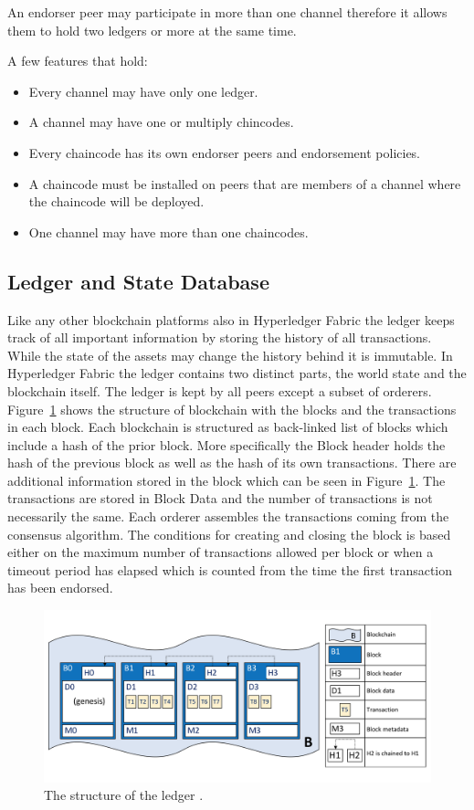 An endorser peer may participate in more than one channel therefore it allows them to hold two ledgers or more at the same time. 

A few features that hold: 
\begin{itemize}
  \item Every channel may have only one ledger.
  \item A channel may have one or multiply chincodes.
  \item Every chaincode has its own endorser peers and endorsement policies.
  \item A chaincode must be installed on peers that are members of a channel where the chaincode will be deployed. 
  \item One channel may have more than one chaincodes.
  \end{itemize}


\subsection{Ledger and State Database}

Like any other blockchain platforms also in Hyperledger Fabric the ledger keeps track of all important information by storing the history of all transactions. While the state of the assets may change the history behind it is immutable. In Hyperledger Fabric the ledger contains two distinct parts, the world state and the blockchain itself. 
The ledger is kept by all peers except a subset of orderers. 
Figure~\ref{fig:ledgerdiagram} shows the structure of blockchain with the blocks and the transactions in each block. Each blockchain is structured as back-linked list of blocks which include a hash of the prior block. More specifically the Block header holds the hash of the previous block as well as the hash of its own transactions. There are additional information stored in the block which can be seen in  Figure~\ref{fig:ledgerdiagram}. The transactions are stored in Block Data and the number of transactions is not necessarily the same. Each orderer assembles the transactions coming from the consensus algorithm. The conditions for creating and closing the block is based either on the maximum number of transactions allowed per block or when a timeout period has elapsed which is counted from the time the first transaction has been endorsed. 

\begin{figure}[!htb]
    \centering
    \includegraphics[width=1\textwidth]{figures/ledgediagram.png}
    \caption{The structure of the ledger \cite{ledger}. }
    \label{fig:ledgerdiagram}
\end{figure}

